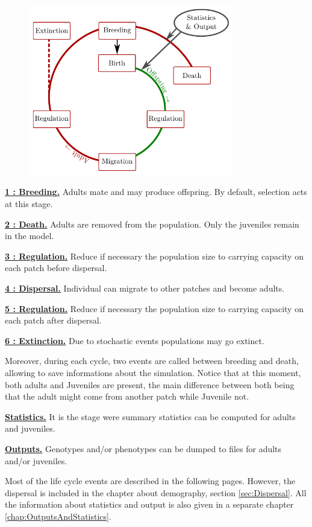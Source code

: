 \documentclass[letterpaper,12pt,oneside]{book}
\begin{document}
\begin{figure}[h]
    \centering
        \includegraphics[width=0.80\textwidth]{life_cycle.pdf}
    \label{fig:life-cycle}
\end{figure}
\begin{description}
\item \textbf{\hyperref[sec:MatingSystem]{1 : Breeding.}} Adults mate and may produce offspring. By default, selection acts at this stage.
\item \textbf{\hyperref[sec:Death]{2 : Death.}} Adults are removed from the population. Only the juveniles remain in the model.
\item \textbf{\hyperref[sec:RegulationOffspring]{3 : Regulation.}} Reduce if necessary the population size to carrying capacity on each patch before dispersal. 
\item \textbf{\hyperref[sec:Dispersal]{4 : Dispersal.}} Individual can migrate to other patches and become adults. 
\item \textbf{\hyperref[sec:RegulationAdults]{5 : Regulation.}} Reduce if necessary the population size to carrying capacity on each patch after dispersal. 
\item \textbf{\hyperref[sec:Extinction]{6 : Extinction.}} Due to stochastic events populations may go extinct.
\end{description}
Moreover, during each cycle,  two events are called between breeding and death, allowing to save informations about the simulation.  Notice that at this moment, both adults and Juveniles are present, the main difference between both being that the adult might come from another patch while Juvenile not. 
\begin{description}
\item \textbf{\hyperref[sec:Statistics]{Statistics.}} It is the stage were summary statistics can be computed for adults and juveniles.
\item \textbf{\hyperref[sec:Output]{Outputs.}} Genotypes and/or phenotypes can be dumped to files for adults and/or juveniles.
\end{description}
Most of the life cycle events are described in the following pages. However, the dispersal is included in the chapter about demography,  section \ref{sec:Dispersal}. All the information about statistics and output is also given in a separate chapter \ref{chap:OutputsAndStatistics}.
\end{document}
